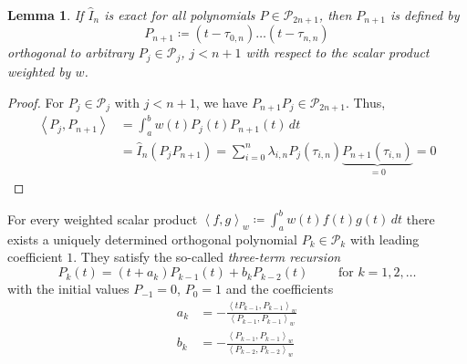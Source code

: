 \documentclass[a4paper]{article}
\newcounter{lecref}[section]
\numberwithin{lecref}{section}
\theoremstyle{break}
\newtheorem{lemma}[lecref]{Lemma}
\newcommand{\IP}[2]{\left\langle#1, #2\right\rangle}
\begin{document}
\begin{lemma}
  \label{lemma:5-10}
  If $\hat{I}_n$ is exact for all polynomials $P \in \mathcal P_{2n+1}$, then $P_{n+1}$ is defined by \[ P_{n+1} \coloneqq (t - \tau_{0,n}) \dots (t - \tau_{n,n}) \]
  orthogonal to arbitrary $P_j \in \mathcal P_j$, $j < n + 1$ with respect to the scalar product weighted by $w$.
\end{lemma}

\begin{proof}
  For $P_j \in \mathcal P_j$ with $j < n+1$, we have $P_{n+1} P_j \in \mathcal P_{2n+1}$.
  Thus,
  \begin{align*}
    \IP{P_j}{P_{n+1}} &= \int_a^b w(t) P_j(t) P_{n+1}(t) \, dt \\
      &= \hat{I}_n(P_j P_{n+1}) = \sum_{i=0}^n \lambda_{i,n} P_j(\tau_{i,n}) \underbrace{P_{n+1}(\tau_{i,n})}_{=0} = 0
  \end{align*}
\end{proof}

\begin{theorem}
  For every weighted scalar product ${\IP fg}_w \coloneqq \int_a^b w(t) f(t) g(t) \, dt$ there exists a uniquely determined orthogonal polynomial $P_k \in \mathcal P_k$ with leading coefficient $1$. They satisfy the so-called \emph{three-term recursion}
  \[ P_k(t) = (t + a_k) P_{k-1}(t) + b_k P_{k-2}(t) \qquad \text{ for } k = 1,2,\dots \]
  with the initial values $P_{-1} = 0$, $P_0 = 1$ and the coefficients
  \begin{align*}
    a_k &= -\frac{\IP{t P_{k-1}}{P_{k-1}}_w}{\IP{P_{k-1}}{P_{k-1}}_w} \\
    b_k &= -\frac{\IP{P_{k-1}}{P_{k-1}}_w}{\IP{P_{k-2}}{P_{k-2}}_w}
  \end{align*}
\end{theorem}
\end{document}
